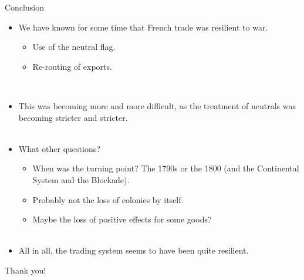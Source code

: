\documentclass[11pt]{beamer}
\begin{document}
\begin{frame}{Conclusion}
\begin{itemize}
\item{We have known for some time that French trade was resilient to war.}
\begin{itemize}
\item{Use of the neutral flag.}
\item{Re-routing of exports.}
\end{itemize}~\\
\item{This was becoming more and more difficult, as the treatment of neutrals was becoming stricter and stricter.}\\~\\
\item{What other questions?}
\begin{itemize}
\item{When was the turning point? The 1790s or the 1800 (and the Continental System and the Blockade).}
\item{Probably not the loss of colonies by itself.}
\item{Maybe the loss of positive effects for some goods?}\\~\\
\end{itemize}
\item{All in all, the trading system seems to have been quite resilient.}

\end{itemize}
\end{frame}




%


\begin{frame}
\begin{center}
\Huge{Thank you!}
\end{center}

\end{frame}
\end{document}
